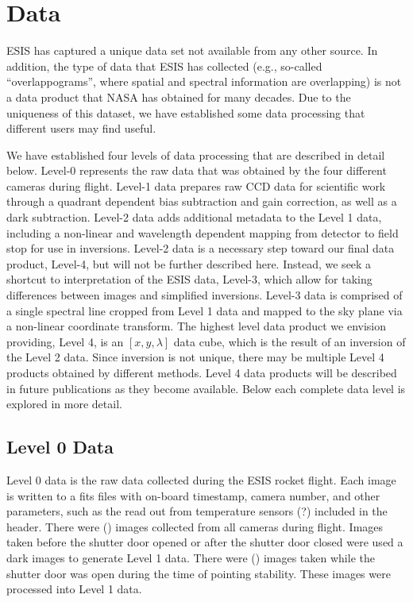 \section{Data} 

	ESIS has captured a unique data set not  available from any other source.  
	In addition, the type of data that ESIS has collected (e.g., so-called ``overlappograms'', where spatial and spectral information are overlapping) is not a data product that NASA has obtained for many decades.  Due to the uniqueness of this dataset, we have established some data processing that different users may find useful.
  
    We have established four levels of data processing that are described in detail below.
    Level-0 represents the raw data that was obtained by the four different cameras during flight.
    Level-1 data prepares raw CCD data for scientific work through a quadrant dependent bias subtraction and gain correction, as well as a dark subtraction.  
    Level-2 data adds additional metadata to the Level 1 data, including a non-linear and wavelength dependent mapping from detector to field stop for use in inversions. 
    Level-2 data is a necessary step toward our final data product, Level-4, but will not be further described here. 
    Instead, we seek a shortcut to interpretation of the ESIS data, Level-3, which allow for taking differences between images and simplified inversions.
    Level-3 data is comprised of a single spectral line cropped from Level 1 data and mapped to the sky plane via a non-linear coordinate transform.
    The highest level data product we envision providing, Level 4, is an $[x, y , \lambda]$ data cube, which is the result of an inversion of the Level 2 data. Since inversion is not unique, there may be multiple Level 4 products obtained by different methods.  Level 4 data products will be described in future publications as they become available.  
    Below each complete data level is explored in more detail.
    
    \subsection{Level 0 Data}
	    Level 0 data is the raw data collected during the ESIS rocket flight.  
	    Each image is written to a fits files with on-board timestamp, camera number, and other parameters, such as the read out from temperature sensors (?) included in the header.  There were () images collected from all cameras during flight.  
	    Images taken before the shutter door opened or after the shutter door closed were used a dark images to generate Level 1 data.  
	    There were () images taken while the shutter door was open during the time of pointing stability.  
	    These images were processed into Level 1 data.  

